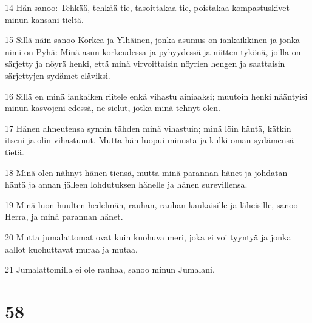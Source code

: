 \par 14 Hän sanoo: Tehkää, tehkää tie, tasoittakaa tie, poistakaa kompastuskivet minun kansani tieltä.
\par 15 Sillä näin sanoo Korkea ja Ylhäinen, jonka asumus on iankaikkinen ja jonka nimi on Pyhä: Minä asun korkeudessa ja pyhyydessä ja niitten tykönä, joilla on särjetty ja nöyrä henki, että minä virvoittaisin nöyrien hengen ja saattaisin särjettyjen sydämet eläviksi.
\par 16 Sillä en minä iankaiken riitele enkä vihastu ainiaaksi; muutoin henki nääntyisi minun kasvojeni edessä, ne sielut, jotka minä tehnyt olen.
\par 17 Hänen ahneutensa synnin tähden minä vihastuin; minä löin häntä, kätkin itseni ja olin vihastunut. Mutta hän luopui minusta ja kulki oman sydämensä tietä.
\par 18 Minä olen nähnyt hänen tiensä, mutta minä parannan hänet ja johdatan häntä ja annan jälleen lohdutuksen hänelle ja hänen surevillensa.
\par 19 Minä luon huulten hedelmän, rauhan, rauhan kaukaisille ja läheisille, sanoo Herra, ja minä parannan hänet.
\par 20 Mutta jumalattomat ovat kuin kuohuva meri, joka ei voi tyyntyä ja jonka aallot kuohuttavat muraa ja mutaa.
\par 21 Jumalattomilla ei ole rauhaa, sanoo minun Jumalani.

\chapter{58}

